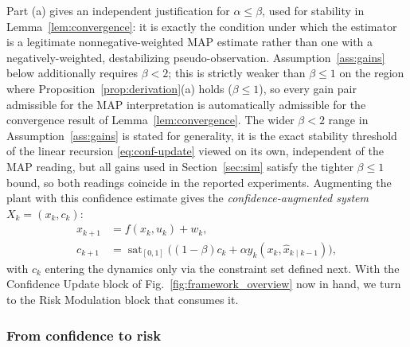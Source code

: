 \documentclass[letterpaper, 10 pt, conference]{ieeeconf}
\begin{document}
Part (a) gives an independent justification for $\alpha\le\beta$, used for stability in Lemma~\ref{lem:convergence}: it is exactly the condition under which the estimator is a legitimate nonnegative-weighted MAP estimate rather than one with a negatively-weighted, destabilizing pseudo-observation. Assumption~\ref{ass:gains} below additionally requires $\beta<2$; this is strictly weaker than $\beta\le1$ on the region where Proposition~\ref{prop:derivation}(a) holds ($\beta\le1$), so every gain pair admissible for the MAP interpretation is automatically admissible for the convergence result of Lemma~\ref{lem:convergence}. The wider $\beta<2$ range in Assumption~\ref{ass:gains} is stated for generality,  it is the exact stability threshold of the linear recursion \eqref{eq:conf-update} viewed on its own, independent of the MAP reading,  but all gains used in Section~\ref{sec:sim} satisfy the tighter $\beta\le1$ bound, so both readings coincide in the reported experiments.
Augmenting the plant with this confidence estimate gives the \emph{confidence-augmented system} $X_k=(x_k,c_k)$:
\begin{equation}
\begin{aligned}
x_{k+1} &= f(x_k,u_k) + w_k, \\
c_{k+1} &= \operatorname{sat}_{[0,1]}\!\big((1-\beta)c_k+\alpha y_k(x_k,\hat x_{k\mid k-1})\big),
\end{aligned}
\label{eq:augmented}
\end{equation}
with $c_k$ entering the dynamics only via the constraint set defined next. With the Confidence Update block of Fig.~\ref{fig:framework_overview} now in hand, we turn to the Risk Modulation block that consumes it.

\subsubsection{From confidence to risk}
\label{sec:confidence-risk}
\end{document}
